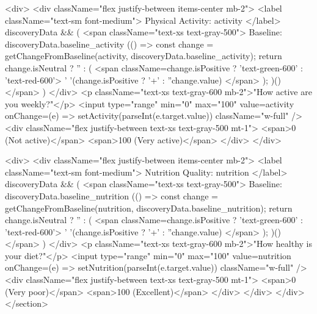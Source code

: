 {            <div>
              <div className="flex justify-between items-center mb-2">
                <label className="text-sm font-medium">
                  Physical Activity: {activity}
                </label>
                {discoveryData && (
                  <span className="text-xs text-gray-500">
                    Baseline: {discoveryData.baseline_activity}
                    {(() => {
                      const change = getChangeFromBaseline(activity, discoveryData.baseline_activity);
                      return change.isNeutral ? '' : (
                        <span className={change.isPositive ? 'text-green-600' : 'text-red-600'}>
                          {' '}({change.isPositive ? '+' : ''}{change.value})
                        </span>
                      );
                    })()}
                  </span>
                )}
              </div>
              <p className="text-xs text-gray-600 mb-2">"How active are you weekly?"</p>
              <input
                type="range"
                min="0"
                max="100"
                value={activity}
                onChange={(e) => setActivity(parseInt(e.target.value))}
                className="w-full"
              />
              <div className="flex justify-between text-xs text-gray-500 mt-1">
                <span>0 (Not active)</span>
                <span>100 (Very active)</span>
              </div>
            </div>

            <div>
              <div className="flex justify-between items-center mb-2">
                <label className="text-sm font-medium">
                  Nutrition Quality: {nutrition}
                </label>
                {discoveryData && (
                  <span className="text-xs text-gray-500">
                    Baseline: {discoveryData.baseline_nutrition}
                    {(() => {
                      const change = getChangeFromBaseline(nutrition, discoveryData.baseline_nutrition);
                      return change.isNeutral ? '' : (
                        <span className={change.isPositive ? 'text-green-600' : 'text-red-600'}>
                          {' '}({change.isPositive ? '+' : ''}{change.value})
                        </span>
                      );
                    })()}
                  </span>
                )}
              </div>
              <p className="text-xs text-gray-600 mb-2">"How healthy is your diet?"</p>
              <input
                type="range"
                min="0"
                max="100"
                value={nutrition}
                onChange={(e) => setNutrition(parseInt(e.target.value))}
                className="w-full"
              />
              <div className="flex justify-between text-xs text-gray-500 mt-1">
                <span>0 (Very poor)</span>
                <span>100 (Excellent)</span>
              </div>
            </div>
          </div>
        </section>

}
